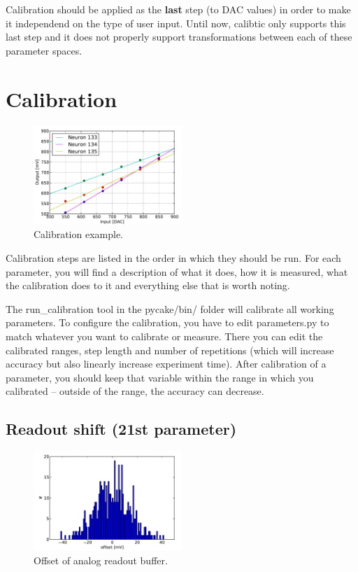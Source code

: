 \documentclass[12pt,a4paper,bibliography=totocnumbered,listof=totocnumbered, DIV12]{scrartcl}
\begin{document}
Calibration should be applied as the \textbf{last} step (to DAC values) in order to make it independend on the type of user input.
Until now, calibtic only supports this last step and it does not properly support transformations between each of these parameter spaces.

\section{Calibration}

\begin{figure}
  \centering
  \includegraphics[width=0.5\textwidth]{figures/calib_example_lines}
  \caption{Calibration example.}
  \label{fig:calibration_example}
\end{figure}

Calibration steps are listed in the order in which they should be run.
For each parameter, you will find a description of what it does, how it is measured, what the calibration does to it and everything else that is worth noting.

The run\_calibration tool in the pycake/bin/ folder will calibrate all working parameters.
To configure the calibration, you have to edit parameters.py to match whatever you want to calibrate or measure.
There you can edit the calibrated ranges, step length and number of repetitions (which will increase accuracy but also linearly increase experiment time).
After calibration of a parameter, you should keep that variable within the range in which you calibrated -- outside of the range, the accuracy can decrease.

\subsection{Readout shift (21st parameter)}

\begin{figure}
  \centering
  \includegraphics[width=0.5\textwidth]{figures/analog_readout_offset}
  \caption{Offset of analog readout buffer.}
  \label{fig:offset_analog}
\end{figure}
\end{document}

